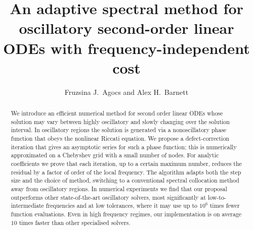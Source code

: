 \documentclass[10pt]{article}
\begin{document}
\title{An adaptive spectral method for oscillatory second-order linear ODEs with frequency-independent cost }

\author{Fruzsina J.\ Agocs and Alex H.\ Barnett}
\maketitle

\begin{abstract}



We introduce an efficient numerical method for second order linear ODEs whose
solution may vary between highly oscillatory and slowly changing over the solution interval.
%
In oscillatory regions the solution is generated via a nonoscillatory phase
function that obeys the nonlinear Riccati equation.
%
We propose a
defect-correction iteration that gives an asymptotic series for such a phase
function; this is numerically approximated on a Chebyshev grid with a small number of nodes.
%
For analytic coefficients we prove that each iteration, up to a certain
maximum number,
reduces the residual by a factor of order of the local frequency. 
%
The algorithm adapts both the step size and the choice of method,
switching to a conventional spectral collocation method
away from oscillatory regions.
%
In numerical experiments we find that our proposal outperforms other state-of-the-art
oscillatory solvers, most significantly at low-to-intermediate
frequencies and at low tolerances, where it may use up to $10^6$
times fewer function evaluations.  Even in high frequency regimes, our
implementation is
on average $10$ times faster than other specialised solvers.
\end{abstract}
\end{document}
